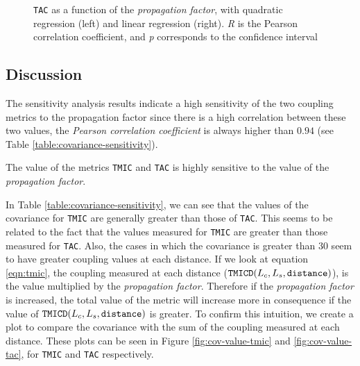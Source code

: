 \begin{figure}[ht!]
\begin{center}
\begin{subfigure}[b]{0.48\textwidth}
  \end{subfigure}
\caption{\texttt{TAC} as a function of the \textit{propagation factor}, with quadratic regression (left) and linear regression (right). \textit{R} is the Pearson correlation coefficient, and \textit{p} corresponds to the confidence interval}
\label{fig:correlation-tac}
\end{center}
\end{figure}

\subsection{Discussion}
The sensitivity analysis results indicate a high sensitivity of the two coupling metrics to the propagation factor since there is a high correlation between these two values, the \textit{Pearson correlation coefficient} is always higher than $0.94$ (see Table \ref{table:covariance-sensitivity}).

\begin{finding}
	The value of the metrics \texttt{TMIC} and \texttt{TAC} is highly sensitive to the value of the \textit{propagation factor}.
	\label{find:high-sensitivity}
\end{finding}

In Table \ref{table:covariance-sensitivity}, we can see that the values of the covariance for \texttt{TMIC} are generally greater than those of \texttt{TAC}. This seems to be related to the fact that the values measured for \texttt{TMIC} are greater than those measured for \texttt{TAC}. Also, the cases in which the covariance is greater than $30$ seem to have greater coupling values at each distance. If we look at equation \ref{eqn:tmic}, the coupling measured at each distance ($\verb|TMICD|(L_c,L_s, \verb|distance|)$), is the value multiplied by the \textit{propagation factor}. Therefore if the \textit{propagation factor} is increased, the total value of the metric will increase more in consequence if the value of $\verb|TMICD|(L_c,L_s, \verb|distance|)$ is greater. To confirm this intuition, we create a plot to compare the covariance with the sum of the coupling measured at each distance. These plots can be seen in Figure \ref{fig:cov-value-tmic} and \ref{fig:cov-value-tac}, for \texttt{TMIC} and \texttt{TAC} respectively.

